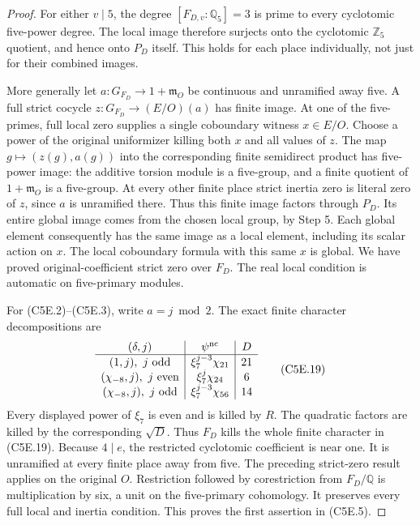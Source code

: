 \begin{proof}
For either $v\mid5$, the degree $[F_{D,v}:\mathbb Q_5]=3$
is prime to every cyclotomic five-power degree.  The local
image therefore surjects onto the cyclotomic $\mathbb Z_5$
quotient, and hence onto $P_D$ itself.  This holds for each
place individually, not just for their combined images.

More generally let $a:G_{F_D}\to1+\mathfrak m_O$ be continuous
and unramified away five.  A full strict cocycle
$z:G_{F_D}\to(E/O)(a)$ has finite image.
At one of the five-primes, full local zero supplies a single
coboundary witness $x\in E/O$.  Choose a power of the original
uniformizer killing both $x$ and all values of $z$.
The map $g\mapsto(z(g),a(g))$ into the corresponding finite
semidirect product has five-power image: the additive torsion
module is a five-group, and a finite quotient of $1+\mathfrak m_O$
is a five-group.  At every other finite place strict inertia
zero is literal zero of $z$, since $a$ is unramified there.
Thus this finite image factors through $P_D$.
Its entire global image comes from the chosen local group,
by Step 5.  Each global element consequently has the same
image as a local element, including its scalar action on $x$.
The local coboundary formula with this same $x$ is global.
We have proved original-coefficient strict zero over $F_D$.
The real local condition is automatic on five-primary modules.

For (C5E.2)--(C5E.3), write $a=j\bmod2$.  The exact finite
character decompositions are
\[
 \begin{array}{c|c|c}
 (\delta,j)&\psi^{\rm nc}&D\\\hline
 (1,j),\ j\text{ odd}&\xi_7^{j-3}\chi_{21}&21\\
 (\chi_{-8},j),\ j\text{ even}&\xi_7^{j}\chi_{24}&6\\
 (\chi_{-8},j),\ j\text{ odd}&\xi_7^{j-3}\chi_{56}&14
 \end{array}
 \tag{C5E.19}
\]
Every displayed power of $\xi_7$ is even and is killed by $R$.
The quadratic factors are killed by the corresponding $\sqrt D$.
Thus $F_D$ kills the whole finite character in (C5E.19).
Because $4\mid e$, the restricted cyclotomic coefficient is
near one.  It is unramified at every finite place away from five.
The preceding strict-zero result applies on the original $O$.
Restriction followed by corestriction from $F_D/\mathbb Q$
is multiplication by six, a unit on the five-primary cohomology.
It preserves every full local and inertia condition.
This proves the first assertion in (C5E.5).


\end{proof}
